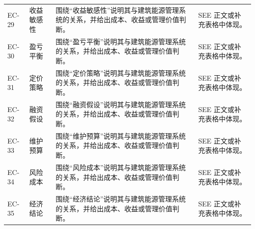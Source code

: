 \documentclass[12pt,a4paper]{ctexart}
\begin{document}
\begin{longtable}{L{1.8cm}L{3.3cm}L{6.2cm}L{4.0cm}}
EC-29 & 收益敏感性 & 围绕“收益敏感性”说明其与建筑能源管理系统的关系，并给出成本、收益或管理价值判断。 & SEE 正文或补充表格中体现。 \\
EC-30 & 盈亏平衡 & 围绕“盈亏平衡”说明其与建筑能源管理系统的关系，并给出成本、收益或管理价值判断。 & SEE 正文或补充表格中体现。 \\
EC-31 & 定价策略 & 围绕“定价策略”说明其与建筑能源管理系统的关系，并给出成本、收益或管理价值判断。 & SEE 正文或补充表格中体现。 \\
EC-32 & 融资假设 & 围绕“融资假设”说明其与建筑能源管理系统的关系，并给出成本、收益或管理价值判断。 & SEE 正文或补充表格中体现。 \\
EC-33 & 维护预算 & 围绕“维护预算”说明其与建筑能源管理系统的关系，并给出成本、收益或管理价值判断。 & SEE 正文或补充表格中体现。 \\
EC-34 & 风险成本 & 围绕“风险成本”说明其与建筑能源管理系统的关系，并给出成本、收益或管理价值判断。 & SEE 正文或补充表格中体现。 \\
EC-35 & 经济结论 & 围绕“经济结论”说明其与建筑能源管理系统的关系，并给出成本、收益或管理价值判断。 & SEE 正文或补充表格中体现。 \\
\bottomrule
\end{longtable}
\end{document}
